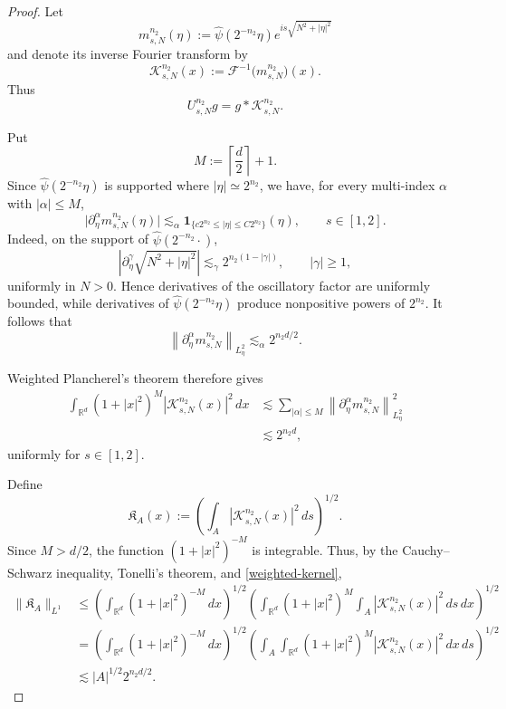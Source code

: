 \documentclass[a4paper,reqno]{amsart}
\numberwithin{equation}{section}
\begin{document}
	\begin{proof}
		Let
		\[
		m_{s,N}^{n_2}(\eta)
		:=
		\widehat\psi(2^{-n_2}\eta)
		e^{is\sqrt{N^2+|\eta|^2}}
		\]
		and denote its inverse Fourier transform by
		\[
		\mathcal K_{s,N}^{n_2}(x)
		:=
		\mathcal F^{-1}\bigl(m_{s,N}^{n_2}\bigr)(x).
		\]
		Thus
		\[
		U_{s,N}^{n_2}g
		=
		g*\mathcal K_{s,N}^{n_2}.
		\]
		
		Put
		\[
		M:=\left\lceil\frac d2\right\rceil+1.
		\]
		Since \(\widehat\psi(2^{-n_2}\eta)\) is supported where
		\(|\eta|\simeq 2^{n_2}\), we have, for every multi-index
		\(\alpha\) with \(|\alpha|\leq M\),
		\[
		\bigl|
		\partial_\eta^\alpha m_{s,N}^{n_2}(\eta)
		\bigr|
		\lesssim_\alpha
		\mathbf 1_{\{c2^{n_2}\leq|\eta|\leq C2^{n_2}\}}(\eta),
		\qquad s\in[1,2].
		\]
		Indeed, on the support of \(\widehat\psi(2^{-n_2}\cdot)\),
		\[
		\left|
		\partial_\eta^\gamma
		\sqrt{N^2+|\eta|^2}
		\right|
		\lesssim_\gamma
		2^{n_2(1-|\gamma|)},
		\qquad |\gamma|\geq1,
		\]
		uniformly in \(N>0\). Hence derivatives of the oscillatory
		factor are uniformly bounded, while derivatives of
		\(\widehat\psi(2^{-n_2}\eta)\) produce nonpositive powers of
		\(2^{n_2}\). It follows that
		\[
		\left\|
		\partial_\eta^\alpha m_{s,N}^{n_2}
		\right\|_{L^2_\eta}
		\lesssim_\alpha
		2^{n_2d/2}.
		\]
		
		Weighted Plancherel's theorem therefore gives
		\begin{align}
			\int_{\mathbb R^d}
			(1+|x|^2)^M
			|\mathcal K_{s,N}^{n_2}(x)|^2\,dx
			&\lesssim
			\sum_{|\alpha|\leq M}
			\left\|
			\partial_\eta^\alpha m_{s,N}^{n_2}
			\right\|_{L^2_\eta}^2
			\nonumber\\
			&\lesssim
			2^{n_2d},
			\label{weighted-kernel}
		\end{align}
		uniformly for \(s\in[1,2]\).
		
		Define
		\[
		\mathfrak K_A(x)
		:=
		\left(
		\int_A
		|\mathcal K_{s,N}^{n_2}(x)|^2\,ds
		\right)^{1/2}.
		\]
		Since \(M>d/2\), the function \((1+|x|^2)^{-M}\) is
		integrable. Thus, by the Cauchy--Schwarz inequality,
		Tonelli's theorem, and \eqref{weighted-kernel},
		\begin{align*}
			\|\mathfrak K_A\|_{L^1}
			&\leq
			\left(
			\int_{\mathbb R^d}(1+|x|^2)^{-M}\,dx
			\right)^{1/2}
			\left(
			\int_{\mathbb R^d}
			(1+|x|^2)^M
			\int_A
			|\mathcal K_{s,N}^{n_2}(x)|^2\,ds\,dx
			\right)^{1/2}
			\\
			&=
			\left(
			\int_{\mathbb R^d}(1+|x|^2)^{-M}\,dx
			\right)^{1/2}
			\left(
			\int_A
			\int_{\mathbb R^d}
			(1+|x|^2)^M
			|\mathcal K_{s,N}^{n_2}(x)|^2\,dx\,ds
			\right)^{1/2}
			\\
			&\lesssim
			|A|^{1/2}2^{n_2d/2}.
		\end{align*}
		

\end{proof}
\end{document}
